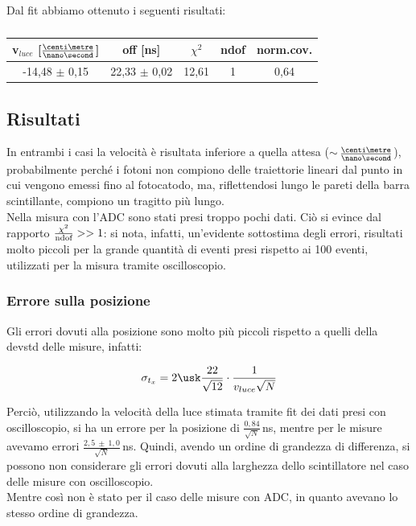 \documentclass[a4paper,twocolumn]{article}
\begin{document}
Dal fit abbiamo ottenuto i seguenti risultati:

\begin{table}[H]
\begin{tabular}{|c|c|c|c|c|}
\hline
v$_{luce}$ [$\frac{\centi\metre}{\nano\second}$] & off [ns] & $\chi ^2$ & ndof & norm.cov.  \\
\hline
-14,48 $\pm$ 0,15 & 22,33 $\pm$ 0,02 & 12,61 & 1 & 0,64\\
\hline
\end{tabular}
\caption{}
\label{tab:ResFitVLADC}
\end{table}

\subsection{Risultati}
In entrambi i casi la velocità è risultata inferiore a quella attesa ($\sim$\,$\frac{\centi\metre}{\nano\second}$), probabilmente perché i fotoni non compiono delle traiettorie lineari dal punto in cui vengono emessi fino al fotocatodo, ma, riflettendosi lungo le pareti della barra scintillante, compiono un tragitto più lungo.\\
Nella misura con l'ADC sono stati presi troppo pochi dati. Ciò si evince dal rapporto $\frac{\chi^2}{\textnormal{ndof}}>>1$: si nota, infatti, un'evidente sottostima degli errori, risultati molto piccoli per la grande quantità di eventi presi rispetto ai 100 eventi, utilizzati per la misura tramite oscilloscopio.

\subsubsection*{Errore sulla posizione}
\label{sec:ErrPosX}
Gli errori dovuti alla posizione sono molto più piccoli rispetto a quelli della devstd delle misure, infatti:

\begin{equation}
\sigma_{t_x} = 2\usk\frac{22}{\sqrt{12}}\cdot\frac{1}{v_{luce}\sqrt{N}} 
\label{equ:ErrPosVL}
\end{equation}

Perciò, utilizzando la velocità della luce stimata tramite fit dei dati presi con oscilloscopio, si ha un errore per la posizione di $\frac{0,84}{\sqrt{N}}$\,ns, mentre per le misure avevamo errori $\frac{2,5\:\pm\:1,0}{\sqrt{N}}$\,ns. Quindi, avendo un ordine di grandezza di differenza, si possono non considerare gli errori dovuti alla larghezza dello scintillatore nel caso delle misure con oscilloscopio.\\
Mentre così non è stato per il caso delle misure con ADC, in quanto avevano lo stesso ordine di grandezza.
\end{document}
